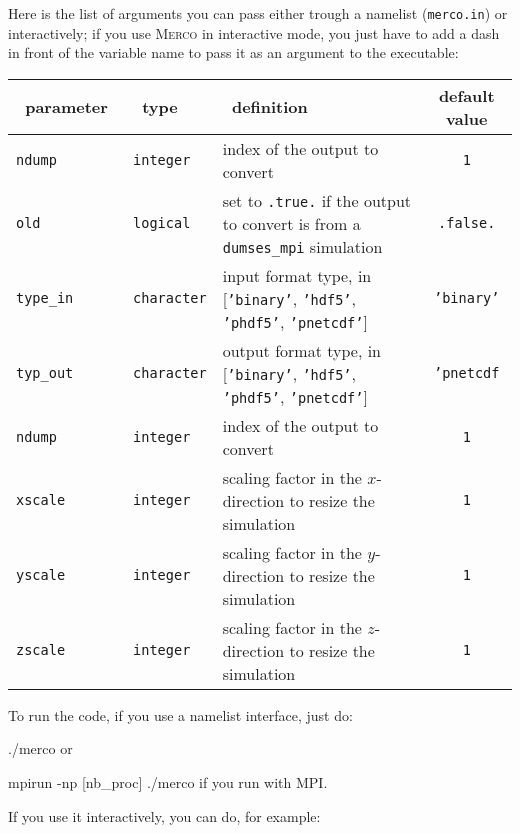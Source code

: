 \documentclass[a4paper,12pt]{article}
\newenvironment{codeblock}[2][]{%
    \minted[bgcolor=LightGray!80!white,fontsize=\small,#1]{#2}%
}{%
    \endminted%
}%
\newenvironment{codeblock}[2][]{\small\verbatim}{\endverbatim}
\begin{document}
Here is the list of arguments you can pass either trough a namelist (\texttt{merco.in}) or interactively; if you use \textsc{Merco} in interactive mode, you just have to add a dash in front of the variable name to pass it as an argument to the executable:
\begin{table}[h!]
  \centering
  {\footnotesize
  \begin{tabular}{l | l | p{} | c }
    ~\hfill parameter\hfill~ & ~\hfill type\hfill~ & ~\hfill definition\hfill~ & default value \\
    \hline
    \hline
    \texttt{ndump} & \texttt{integer} & index of the output to convert & \texttt{1} \\
    \texttt{old} & \texttt{logical} & set to \texttt{.true.} if the output to convert is from a \texttt{dumses\_mpi} simulation & \texttt{.false.} \\
    \texttt{type\_in} & \texttt{character} & input format type, in [\texttt{'binary'}, \texttt{'hdf5'}, \texttt{'phdf5'}, \texttt{'pnetcdf'}] & \texttt{'binary'} \\
    \texttt{typ\_out} & \texttt{character} & output format type, in [\texttt{'binary'}, \texttt{'hdf5'}, \texttt{'phdf5'}, \texttt{'pnetcdf'}] & \texttt{'pnetcdf} \\
    \texttt{ndump} & \texttt{integer} & index of the output to convert & \texttt{1} \\
    \texttt{xscale} & \texttt{integer} & scaling factor in the $x$-direction to resize the simulation & \texttt{1} \\
    \texttt{yscale} & \texttt{integer} & scaling factor in the $y$-direction to resize the simulation & \texttt{1} \\
    \texttt{zscale} & \texttt{integer} & scaling factor in the $z$-direction to resize the simulation & \texttt{1} \\
    \hline
    \end{tabular}
  }
\end{table}

To run the code, if you use a namelist interface, just do:

\begin{codeblock}{bash}
  ./merco
\end{codeblock}
or

\begin{codeblock}{bash}
  mpirun -np [nb_proc] ./merco
\end{codeblock}
if you run with MPI.

If you use it interactively, you can do, for example:
\end{document}
